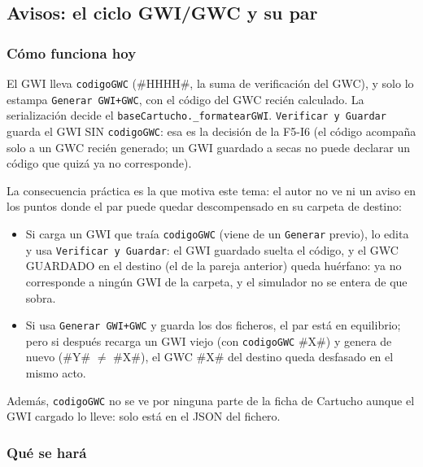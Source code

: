 \subsection{Avisos: el ciclo GWI/GWC y su par}
\label{sec:F5I17Par}

\subsubsection{Cómo funciona hoy}
\label{sec:F5I17ParHoy}

El GWI lleva \texttt{codigoGWC} (\#HHHH\#, la suma de verificación del GWC), y solo lo estampa \texttt{Generar GWI+GWC}, con el código del GWC recién calculado. 
La serialización decide el \texttt{baseCartucho.\_formatearGWI}. \texttt{Verificar y Guardar} guarda el GWI SIN \texttt{codigoGWC}: esa es la decisión de la F5-I6 (el código acompaña solo a un GWC recién generado; un GWI guardado a secas no puede declarar un código que quizá ya no corresponde).

La consecuencia práctica es la que motiva este tema: el autor no ve ni un aviso en los puntos donde el par puede quedar descompensado en su carpeta de destino:

\begin{itemize}
	\item Si carga un GWI que traía \texttt{codigoGWC} (viene de un \texttt{Generar} previo), lo edita y usa \texttt{Verificar y Guardar}: el GWI guardado suelta el código, y el GWC GUARDADO en el destino (el de la pareja anterior) queda huérfano: ya no corresponde a ningún GWI de la carpeta, y el simulador no se entera de que sobra.
	\item Si usa \texttt{Generar GWI+GWC} y guarda los dos ficheros, el par está en equilibrio; pero si después recarga un GWI viejo (con \texttt{codigoGWC} \#X\#) y genera de nuevo (\#Y\# $\neq$ \#X\#), el GWC \#X\# del destino queda desfasado en el mismo acto.
\end{itemize}

Además, \texttt{codigoGWC} no se ve por ninguna parte de la ficha de Cartucho aunque el GWI cargado lo lleve: solo está en el JSON del fichero.

\subsubsection{Qué se hará}
\label{sec:F5I17ParQue}

